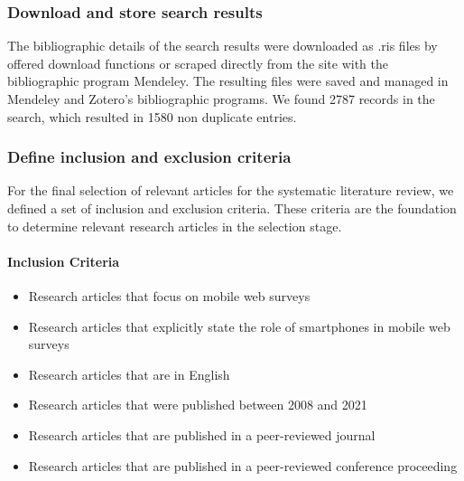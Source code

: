 \subsubsection{Download and store search results}

The bibliographic details of the search results were downloaded as .ris files by offered download functions or scraped directly from the site with the bibliographic program Mendeley. The resulting files were saved and managed in Mendeley and Zotero's bibliographic programs. We found 2787 records in the search, which resulted in 1580 non duplicate entries.

\subsubsection{Define inclusion and exclusion criteria}
\label{subsec: Inclusion and Exclusion Criteria}

For the final selection of relevant articles for the systematic literature review, we defined a set of inclusion and exclusion criteria. These criteria are the foundation to determine relevant research articles in the selection stage.

\paragraph{Inclusion Criteria}
\begin{itemize}
    \item Research articles that focus on mobile web surveys
    \item Research articles that explicitly state the role of smartphones in mobile web surveys
    \item Research articles that are in English
    \item Research articles that were published between 2008 and 2021
    \item Research articles that are published in a peer-reviewed journal
    \item Research articles that are published in a peer-reviewed conference proceeding
\end{itemize}

